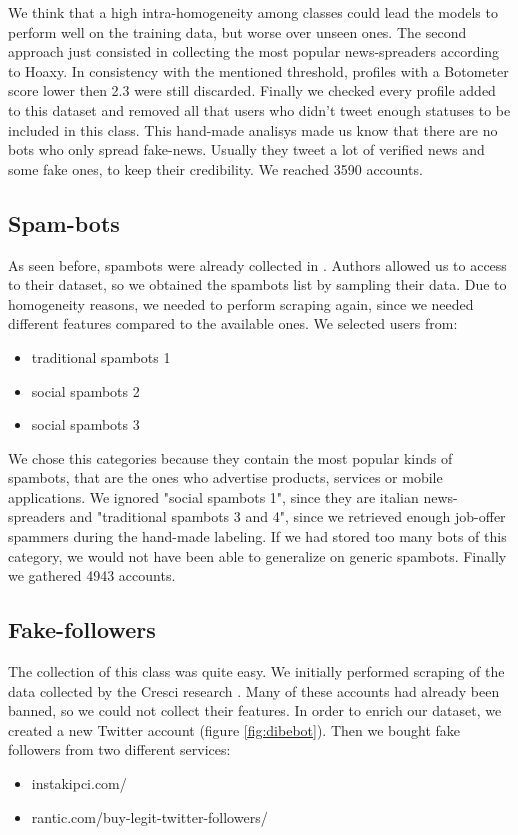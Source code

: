 We think that a high intra-homogeneity among classes could lead the models to perform well on the training data, but worse over unseen ones.
The second approach just consisted in collecting the most popular news-spreaders according to Hoaxy. In consistency with the mentioned threshold, profiles with a Botometer score lower then 2.3 were still discarded.
Finally we checked every profile added to this dataset and removed all that users who didn't tweet enough statuses to be included in this class. This hand-made analisys made us know that there are no bots who only spread fake-news. Usually they tweet a lot of verified news and some fake ones, to keep their credibility.
We reached 3590 accounts.

\subsection{Spam-bots}
As seen before, spambots were already collected in \cite{Cresci}. Authors allowed us to access to their dataset, so we obtained the spambots list by sampling their data. Due to homogeneity reasons, we needed to perform scraping again, since we needed different features compared to the available ones.
We selected users from:
\begin{itemize}
	\item[\PencilRight]traditional spambots 1
	\item[\PencilRight]social spambots 2
	\item[\PencilRight]social spambots 3
\end{itemize}

We chose this categories because they contain the most popular kinds of spambots, that are the ones who advertise products, services or mobile applications. We ignored "social spambots 1", since they are italian news-spreaders and "traditional spambots 3 and 4", since we retrieved enough job-offer spammers during the hand-made labeling. If we had stored too many bots of this category, we would not have been able to generalize on generic spambots. Finally we gathered 4943 accounts.

\subsection{Fake-followers}
The collection of this class was quite easy. We initially performed scraping of the data collected by the Cresci research \cite{Cresci}. Many of these accounts had already been banned, so we could not collect their features. In order to enrich our dataset, we created a new Twitter account (figure \ref{fig:dibebot}). Then we bought fake followers from two different services:
\begin{itemize}
	\item[\PencilRight] instakipci.com/
	\item[\PencilRight] rantic.com/buy-legit-twitter-followers/
\end{itemize}

